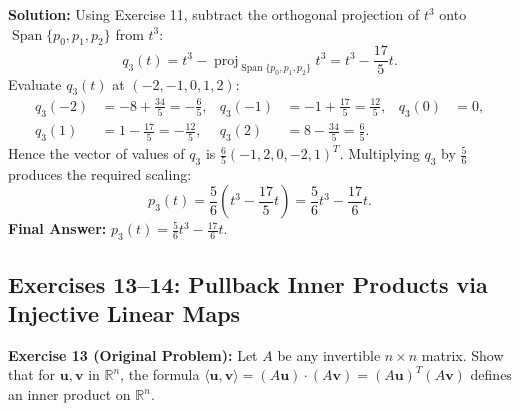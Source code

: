 \documentclass[11pt, letterpaper]{article}
\theoremstyle{definition}
\theoremstyle{remark}
\begin{document}
\textbf{Solution:}
Using Exercise 11, subtract the orthogonal projection of $t^3$ onto $\operatorname{Span}\{p_0, p_1, p_2\}$ from $t^3$:
\[
    q_3(t) = t^3 - \operatorname{proj}_{\operatorname{Span}\{p_0, p_1, p_2\}} t^3 = t^3 - \frac{17}{5}t.
\]
Evaluate $q_3(t)$ at $(-2, -1, 0, 1, 2)$:
\begin{align*}
    q_3(-2) &= -8 + \frac{34}{5} = -\frac{6}{5}, &
    q_3(-1) &= -1 + \frac{17}{5} = \frac{12}{5}, &
    q_3(0) &= 0, \\
    q_3(1) &= 1 - \frac{17}{5} = -\frac{12}{5}, &
    q_3(2) &= 8 - \frac{34}{5} = \frac{6}{5}.
\end{align*}
Hence the vector of values of $q_3$ is $\frac{6}{5}(-1, 2, 0, -2, 1)^T$. Multiplying $q_3$ by $\frac{5}{6}$ produces the required scaling:
\[
    p_3(t) = \frac{5}{6}\left(t^3 - \frac{17}{5}t\right) = \frac{5}{6}t^3 - \frac{17}{6}t.
\]
\textbf{Final Answer:} $\displaystyle p_3(t) = \frac{5}{6}t^3 - \frac{17}{6}t$.

\subsection{Exercises 13--14: Pullback Inner Products via Injective Linear Maps}

\textbf{Exercise 13 (Original Problem):} Let $A$ be any invertible $n \times n$ matrix. Show that for $\mathbf{u}, \mathbf{v}$ in $\mathbb{R}^n$, the formula $\langle \mathbf{u}, \mathbf{v} \rangle = (A\mathbf{u}) \cdot (A\mathbf{v}) = (A\mathbf{u})^T(A\mathbf{v})$ defines an inner product on $\mathbb{R}^n$.
\end{document}

